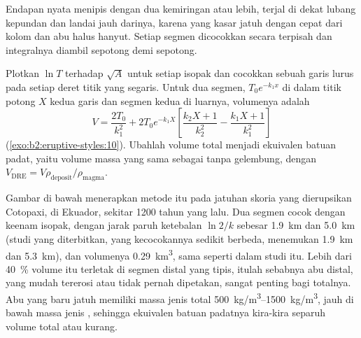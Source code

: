 Endapan nyata menipis dengan dua kemiringan atau lebih, terjal di dekat lubang kepundan dan landai jauh
darinya, karena  yang kasar jatuh dengan cepat dari kolom dan abu halus
hanyut. Setiap segmen dicocokkan secara terpisah dan integralnya diambil sepotong demi
sepotong.

\begin{method}\label{met:b2:eruptive-styles:volume}
Plotkan $\ln T$ terhadap $\sqrt A$ untuk setiap isopak dan cocokkan sebuah garis lurus pada setiap
deret titik yang segaris. Untuk dua segmen, $T_0e^{-k_1x}$ di dalam titik potong
$X$ kedua garis dan segmen kedua di luarnya, volumenya adalah
\[
V = \frac{2T_0}{k_1^2} + 2T_0e^{-k_1X}\left[\frac{k_2X + 1}{k_2^2} -
\frac{k_1X + 1}{k_1^2}\right]
\]
(\cref{exo:b2:eruptive-styles:10}). Ubahlah volume total menjadi ekuivalen batuan padat, yaitu volume
massa yang sama sebagai  tanpa gelembung, dengan $V_{\mathrm{DRE}} = V\rho_{\mathrm{deposit}}/\rho_{\mathrm{magma}}$.
\end{method}

Gambar di bawah menerapkan metode itu pada jatuhan skoria yang dierupsikan Cotopaxi, di
Ekuador, sekitar \num{1200} tahun yang lalu. Dua segmen cocok dengan keenam isopak, dengan
jarak paruh ketebalan $\ln 2/k$ sebesar \qty{1.9}{km} dan \qty{5.0}{km} (studi
yang diterbitkan, yang kecocokannya sedikit berbeda, menemukan \qty{1.9}{km} dan
\qty{5.3}{km}), dan volumenya \qty{0.29}{km^3}, sama seperti dalam studi itu. Lebih dari
\qty{40}{\percent} volume itu terletak di segmen distal yang tipis, itulah sebabnya abu distal,
yang mudah tererosi atau tidak pernah dipetakan, sangat penting bagi totalnya. Abu yang baru jatuh
memiliki massa jenis total \qtyrange{500}{1500}{kg/m^3}, jauh di bawah massa jenis
, sehingga ekuivalen batuan padatnya kira-kira separuh volume total atau kurang.

